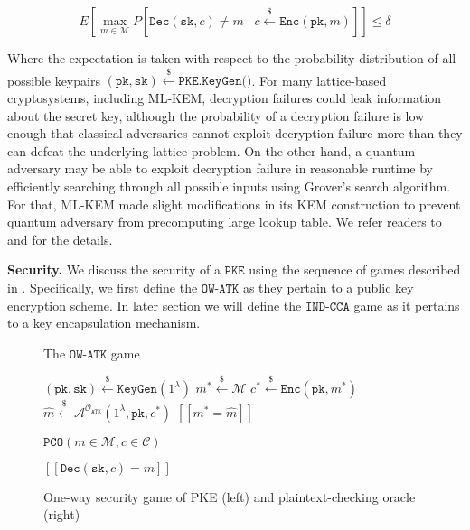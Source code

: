 \documentclass[journal=tches,submission]{iacrtrans}
\newcommand{\pke}{\texttt{PKE}}
\newcommand{\keygen}{\texttt{KeyGen}}
\newcommand{\encrypt}{\texttt{Enc}}
\newcommand{\decrypt}{\texttt{Dec}}
\newcommand{\pk}{\texttt{pk}}
\newcommand{\sk}{\texttt{sk}}
\newcommand{\pco}{\texttt{PCO}}
\newcommand{\leftsample}{\stackrel{\$}{\leftarrow}}
\newcommand{\llbrack}{[\![}
\newcommand{\rrbrack}{]\!]}
\begin{document}
\begin{equation*}
    E\left[\max_{m \in \mathcal{M}} P\left[\decrypt(\sk, c) \neq m \mid c \leftsample \encrypt(\pk, m)\right]\right] \leq \delta
\end{equation*}

Where the expectation is taken with respect to the probability distribution of all possible keypairs $(\pk, \sk) \leftsample \texttt{PKE.KeyGen()}$. For many lattice-based cryptosystems, including ML-KEM, decryption failures could leak information about the secret key, although the probability of a decryption failure is low enough that classical adversaries cannot exploit decryption failure more than they can defeat the underlying lattice problem. On the other hand, a quantum adversary may be able to exploit decryption failure in reasonable runtime by efficiently searching through all possible inputs using Grover's search algorithm. For that, ML-KEM made slight modifications in its KEM construction to prevent quantum adversary from precomputing large lookup table. We refer readers to \cite{avanzi2019crystals} and \cite{DBLP:conf/eurosp/BosDKLLSSSS18} for the details.

\textbf{Security.} We discuss the security of a $\pke$ using the sequence of games described in \cite{shoup2004sequences}. Specifically, we first define the $\texttt{OW-ATK}$ as they pertain to a public key encryption scheme. In later section we will define the $\texttt{IND-CCA}$ game as it pertains to a key encapsulation mechanism.

\def\algowatkgame{
    \begin{algorithm}[H]
        \caption*{The $\texttt{OW-ATK}$ game}
        \begin{algorithmic}[1]
            \State $(\pk, \sk) \leftsample \keygen(1^\lambda)$
            \State $m^\ast \leftsample \mathcal{M}$
            \State $c^\ast \leftsample \encrypt(\pk, m^\ast)$
            \State $\hat{m} \leftsample \mathcal{A}^{\mathcal{O}_\texttt{ATK}}(
                1^\lambda, \pk, c^\ast
            )$
            \State \Return $\llbrack m^\ast = \hat{m} \rrbrack$
        \end{algorithmic}
    \end{algorithm}
}
\def\algpco{
    \begin{algorithm}[H]
        \caption*{$\pco(m \in \mathcal{M}, c \in \mathcal{C})$}
        \begin{algorithmic}[1]
            \State \Return $\llbrack \decrypt(\sk, c) = m \rrbrack$
        \end{algorithmic}
    \end{algorithm}
}
\begin{figure}[H]
    \centering
    \begin{minipage}[b]{0.49\textwidth}
        \algowatkgame
    \end{minipage}
    \begin{minipage}[b]{0.49\textwidth}
        \algpco
    \end{minipage}
    \caption{
        One-way security game of PKE (left) and plaintext-checking oracle (right)
    }\label{fig:ow-game-pco}
\end{figure}
\end{document}
